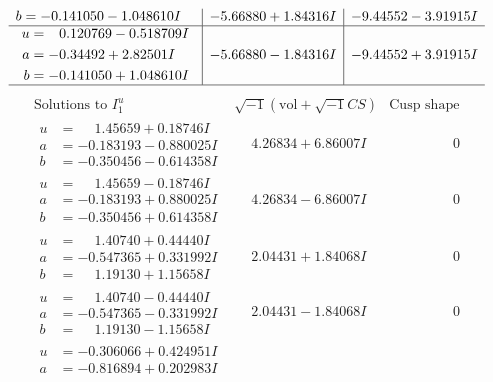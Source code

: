 \documentclass[1p]{elsarticle_modified}
\theoremstyle{definition}
\newcommand{\I}{\sqrt{-1}}
\begin{document}
$$\begin{array}{c|c|c}
\begin{aligned}
b &= -0.141050 - 1.048610 I\end{aligned}
 & -5.66880 + 1.84316 I & -9.44552 - 3.91915 I \\ \hline\begin{aligned}
u &= \phantom{-}0.120769 - 0.518709 I \\
a &= -0.34492 + 2.82501 I \\
b &= -0.141050 + 1.048610 I\end{aligned}
 & -5.66880 - 1.84316 I & -9.44552 + 3.91915 I\\
 \hline 
 \end{array}$$\newpage$$\begin{array}{c|c|c}  
\text{Solutions to }I^u_{1}& \I (\text{vol} + \sqrt{-1}CS) & \text{Cusp shape}\\
 \hline 
\begin{aligned}
u &= \phantom{-}1.45659 + 0.18746 I \\
a &= -0.183193 - 0.880025 I \\
b &= -0.350456 - 0.614358 I\end{aligned}
 & \phantom{-}4.26834 + 6.86007 I & \phantom{-0.000000 } 0 \\ \hline\begin{aligned}
u &= \phantom{-}1.45659 - 0.18746 I \\
a &= -0.183193 + 0.880025 I \\
b &= -0.350456 + 0.614358 I\end{aligned}
 & \phantom{-}4.26834 - 6.86007 I & \phantom{-0.000000 } 0 \\ \hline\begin{aligned}
u &= \phantom{-}1.40740 + 0.44440 I \\
a &= -0.547365 + 0.331992 I \\
b &= \phantom{-}1.19130 + 1.15658 I\end{aligned}
 & \phantom{-}2.04431 + 1.84068 I & \phantom{-0.000000 } 0 \\ \hline\begin{aligned}
u &= \phantom{-}1.40740 - 0.44440 I \\
a &= -0.547365 - 0.331992 I \\
b &= \phantom{-}1.19130 - 1.15658 I\end{aligned}
 & \phantom{-}2.04431 - 1.84068 I & \phantom{-0.000000 } 0 \\ \hline\begin{aligned}
u &= -0.306066 + 0.424951 I \\
a &= -0.816894 + 0.202983 I \\

\end{aligned}
\end{array}$$
\end{document}
